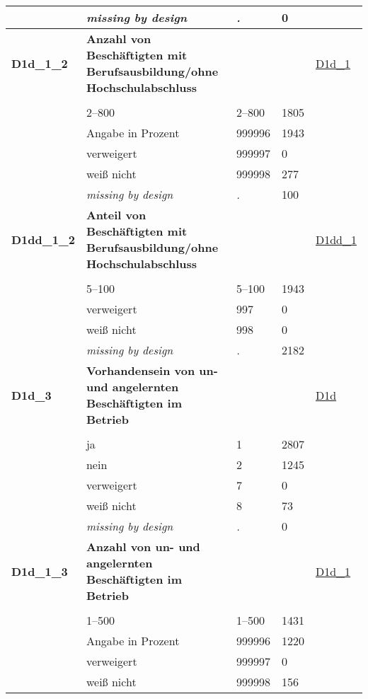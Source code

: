 \begin{longtable}{| L{2.65cm} | L{8cm} | C{1.5cm} | R{1.25cm} | C{2.25cm}  |}
   & \textit{missing by design} & \textit{.} & 0 &  \\ 
   \midrule
\textbf{D1d\_1\_2}\label{var:D1d:1:2} & \textbf{Anzahl von Beschäftigten mit Berufsausbildung/ohne Hochschulabschluss} &  &  & \hyperref[D1d:1]{D1d\_1} \\ 
   &  &  &  &  \\ 
   & 2--800 & 2--800 & 1805 &  \\ 
   & Angabe in Prozent & 999996 & 1943 &  \\ 
   & verweigert & 999997 & 0 &  \\ 
   & weiß nicht & 999998 & 277 &  \\ 
   & \textit{missing by design} & \textit{.} & 100 &  \\ 
   \midrule
\textbf{D1dd\_1\_2}\label{var:D1dd:1:2} & \textbf{Anteil von Beschäftigten mit Berufsausbildung/ohne Hochschulabschluss} &  &  & \hyperref[D1dd:1]{D1dd\_1} \\ 
   &  &  &  &  \\ 
   & 5--100 & 5--100 & 1943 &  \\ 
   & verweigert & 997 & 0 &  \\ 
   & weiß nicht & 998 & 0 &  \\ 
   & \textit{missing by design} & \textit{.} & 2182 &  \\ 
   \midrule
\textbf{D1d\_3}\label{var:D1d:3} & \textbf{Vorhandensein von un- und angelernten Beschäftigten im Betrieb} &  &  & \hyperref[D1d]{D1d} \\ 
   &  &  &  &  \\ 
   & ja & 1 & 2807 &  \\ 
   & nein & 2 & 1245 &  \\ 
   & verweigert & 7 & 0 &  \\ 
   & weiß nicht & 8 & 73 &  \\ 
   & \textit{missing by design} & \textit{.} & 0 &  \\ 
   \midrule
\textbf{D1d\_1\_3}\label{var:D1d:1:3} & \textbf{Anzahl von un- und angelernten Beschäftigten im Betrieb} &  &  & \hyperref[D1d:1]{D1d\_1} \\ 
   &  &  &  &  \\ 
   & 1--500 & 1--500 & 1431 &  \\ 
   & Angabe in Prozent & 999996 & 1220 &  \\ 
   & verweigert & 999997 & 0 &  \\ 
   & weiß nicht & 999998 & 156 &  \\ 

\end{longtable}
